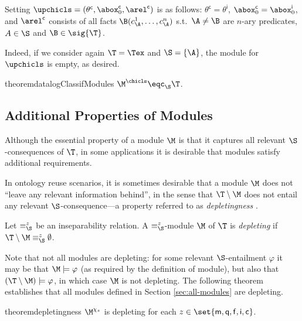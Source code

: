  
\begin{definition} \label{def:chicls}
 Setting $\upchicls= (\theta^{\mathsf{c}}, \abox_0^{\mathsf{c}}, \arel^{\mathsf{c}})$
  is as follows:
  $\theta^{\mathsf{c}} = \theta^{\mathsf{i}}$,
  $\abox_0^{\mathsf{c}} = \abox_0^{\mathsf{i}}$,
  and $\arel^{\mathsf{c}}$ consists of all facts
  $\B(c_{\A}^1, \ldots, c_{\A}^n)$ s.t.\ 
  $\A \neq \B$ are $n$-ary predicates, $A \in \S$ and
  $\B\in\sig{\T}$.
\end{definition}
%
Indeed, if we consider again $\T = \Tex$ and $\S = \{\A\}$, the module
for $\upchicls$ is empty, as desired.

\begin{restatable}{theorem}{datalogClassifModules}
  \label{thm:datalogClassifModules}
  $\M^{\chicls}\eqc_\S\T$. 
\end{restatable}

\subsection{Additional Properties of Modules}

Although the essential property of a module $\M$ is
that it captures all relevant $\S$-consequences of $\T$,
in some applications it is
desirable that modules satisfy additional requirements.
  
In ontology reuse scenarios, it is sometimes desirable that a module
$\M$ does not ``leave any relevant information behind'', in the sense that
$\T \setminus \M$ does not
entail any relevant $\S$-consequence---a property 
referred to as \emph{depletingness}
\cite{DBLP:journals/ai/KontchakovWZ10}.
%
\begin{definition}
  Let $\equiv_{\S}^z$ be an inseparability relation.
  A $\equiv_{\S}^z$-module $\M$ of $\T$ is \emph{depleting} if
  $\T\setminus\M\equiv_{\S}^z\emptyset$.
\end{definition}
%
Note that not all modules are depleting: for some relevant
$\S$-entailment $\varphi$ it may be that $\M \models \varphi$
(as required by the definition of module), but also that
$(\T \setminus \M) \models \varphi$, in which case $\M$ is not depleting.
The following theorem establishes 
that all modules defined in Section \ref{sec:all-modules}
are depleting.
%
\begin{restatable}{theorem}{depletingness}
  $\M^{\chi_z}$ is depleting for each $z\in\set{\mathsf{m},\mathsf{q},\mathsf{f},\mathsf{i},\mathsf{c}}$. 
\end{restatable}


